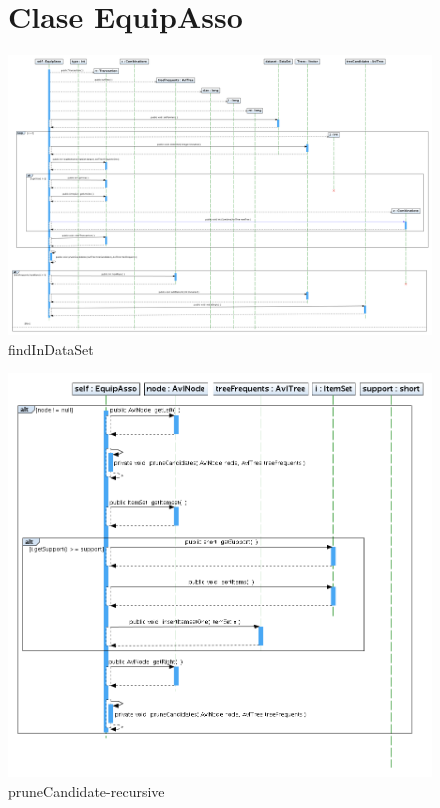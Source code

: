 \begin{figure}
\section{Clase EquipAsso}
\includegraphics[width=1.2\textwidth]{EquipAsso/findInDataSet.png}
\caption{findInDataSet}
\end{figure}
\newpage
\begin{figure}
\includegraphics[width=1.2\textwidth]{EquipAsso/pruneCandidate-recursive.png}
\caption{pruneCandidate-recursive}
\end{figure}
